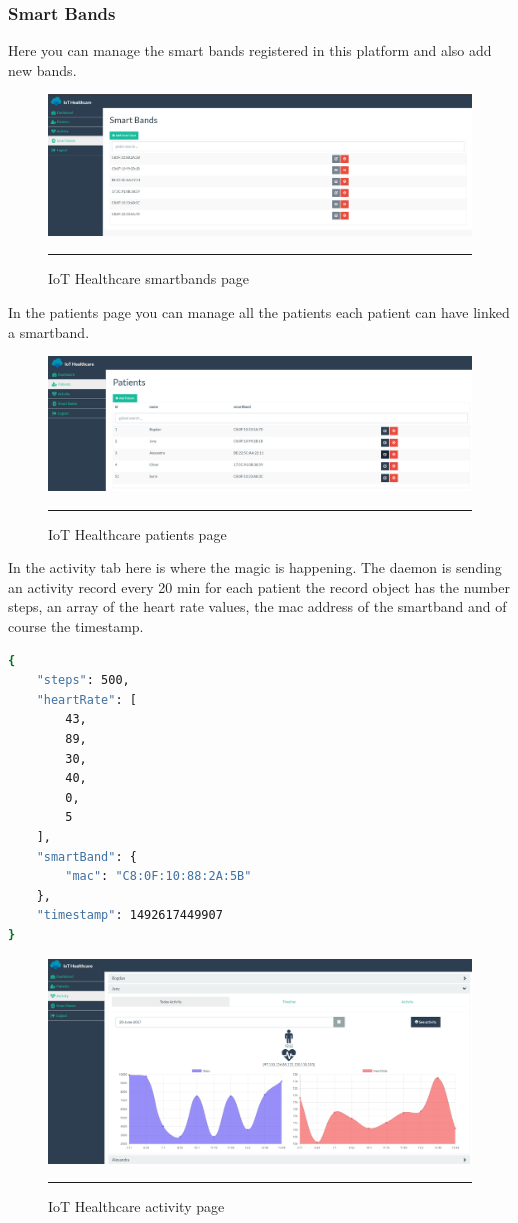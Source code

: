 \subsubsection{Smart Bands}
Here you can manage the smart bands registered in this platform and also add new bands.
\begin{figure}[h!]
	\centering
	\includegraphics[width=1\textwidth]{./images/iothsmartbands}
	\rule{1\textwidth}{1pt}
	\caption{IoT Healthcare smartbands page}
\end{figure}
In the patients page you can manage all the patients each patient can have linked a smartband. 
\begin{figure}[h!]
	\centering
	\includegraphics[width=1\textwidth]{./images/iothpatient}
	\rule{1\textwidth}{1pt}
	\caption{IoT Healthcare patients page}
\end{figure}
In the activity tab here is where the magic is happening. The daemon is sending an activity record every 20 min for each patient the record object has the number steps, an array of the heart rate values, the mac address of the smartband and of course the timestamp. 
\begin{lstlisting}[language=Bash] 
{
	"steps": 500,
	"heartRate": [
		43,
		89,
		30,
		40,
		0,
		5
	],
	"smartBand": {
		"mac": "C8:0F:10:88:2A:5B"
	},
	"timestamp": 1492617449907   
}
\end{lstlisting}      
\begin{figure}[h!]
	\centering
	\includegraphics[width=1\textwidth]{./images/iothactivity}
	\rule{1\textwidth}{1pt}
	\caption{IoT Healthcare activity page}
\end{figure}
